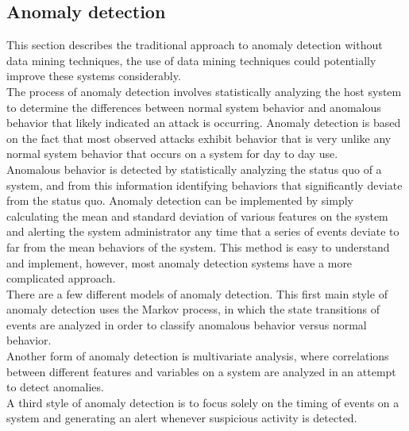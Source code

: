 \documentclass[12pt]{article} %
\begin{document}
\subsection{Anomaly detection}
This section describes the traditional approach to anomaly detection without data mining techniques, the use of data mining techniques could potentially improve these systems considerably.\\ The process of anomaly detection involves statistically analyzing the host system to determine the differences between normal system behavior and anomalous behavior that likely indicated an attack is occurring. Anomaly detection is based on the fact that most observed attacks exhibit behavior that is very unlike any normal system behavior that occurs on a system for day to day use.\\
Anomalous behavior is detected by statistically analyzing the status quo of a system, and from this information identifying behaviors that significantly deviate from the status quo. Anomaly detection can be implemented by simply calculating the mean and standard deviation of various features on the system and alerting the system administrator any time that a series of events deviate to far from the mean behaviors of the system. This method is easy to understand and implement, however, most anomaly detection systems have a more complicated approach.\\
There are a few different models of anomaly detection. This first main style of anomaly detection uses the Markov process, in which the state transitions of events are analyzed in order to classify anomalous behavior versus normal behavior.\\
Another form of anomaly detection is multivariate analysis, where correlations between different features and variables on a system are analyzed in an attempt to detect anomalies.\\
A third style of anomaly detection is to focus solely on the timing of events on a system and generating an alert whenever suspicious activity is detected.\\
\end{document}
